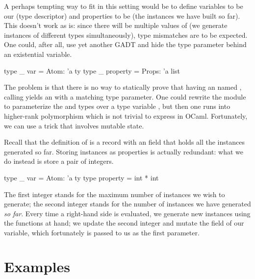A perhaps tempting way to fit in this setting would be to define variables to be
our  (type descriptor) and properties to be  (the
instances we have built so far). This doesn't work as is: since there will be
multiple values of  (we generate instances of different types
simultaneously), type mismatches are to be expected. One could, after all, use
yet another GADT and hide the  type parameter behind an existential
variable.
%
\begin{ocamlcode}
  type _ var = Atom: 'a ty
  type _ property = Props: 'a list
\end{ocamlcode}
%
The problem is that there is no way to statically prove that having an
 named , calling  yields an
 with a matching type parameter. One could rewrite the
 module to parameterize the  and  types over
a type variable , but then one runs into higher-rank polymorphism which
is not trivial to express in OCaml. Fortunately, we can use a trick that
involves mutable state.

Recall that the definition of  is a record with an  field
that holds all the instances generated so far. Storing instances as
properties is actually redundant: what we do instead is store a pair of
integers.
%
\begin{ocamlcode}
  type _ var = Atom: 'a ty
  type property = int * int
\end{ocamlcode}
%
The first integer stands for the maximum number of instances we wish to
generate; the second integer stands for the number of instances we have
generated \emph{so far}.
Every time a right-hand side is evaluated, we generate new instances using the
functions at hand; we update the second integer and mutate the  field
of our variable, which fortunately is passed to us as the first parameter.

\section{Examples}
